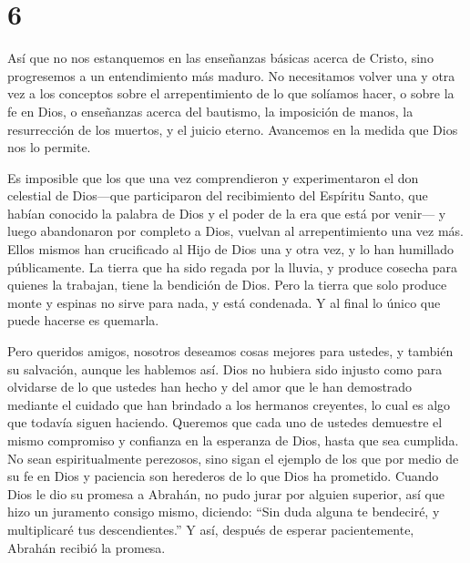 \hypertarget{section-5}{%
\section{6}\label{section-5}}

 Así que no nos estanquemos en las enseñanzas básicas acerca
de Cristo, sino progresemos a un entendimiento más maduro. No
necesitamos volver una y otra vez a los conceptos sobre el
arrepentimiento de lo que solíamos hacer, o sobre la fe en Dios,
 o enseñanzas acerca del bautismo, la imposición de manos,
la resurrección de los muertos, y el juicio eterno. 
Avancemos en la medida que Dios nos lo permite.

 Es imposible que los que una vez comprendieron y
experimentaron el don celestial de Dios---que participaron del
recibimiento del Espíritu Santo,  que habían conocido la
palabra de Dios y el poder de la era que está por venir--- 
y luego abandonaron por completo a Dios, vuelvan al arrepentimiento una
vez más. Ellos mismos han crucificado al Hijo de Dios una y otra vez, y
lo han humillado públicamente.  La tierra que ha sido regada
por la lluvia, y produce cosecha para quienes la trabajan, tiene la
bendición de Dios.  Pero la tierra que solo produce monte y
espinas no sirve para nada, y está condenada. Y al final lo único que
puede hacerse es quemarla.

 Pero queridos amigos, nosotros deseamos cosas mejores para
ustedes, y también su salvación, aunque les hablemos así. 
Dios no hubiera sido injusto como para olvidarse de lo que ustedes han
hecho y del amor que le han demostrado mediante el cuidado que han
brindado a los hermanos creyentes, lo cual es algo que todavía siguen
haciendo.  Queremos que cada uno de ustedes demuestre el
mismo compromiso y confianza en la esperanza de Dios, hasta que sea
cumplida.  No sean espiritualmente perezosos, sino sigan el
ejemplo de los que por medio de su fe en Dios y paciencia son herederos
de lo que Dios ha prometido.  Cuando Dios le dio su promesa
a Abrahán, no pudo jurar por alguien superior, así que hizo un juramento
consigo mismo,  diciendo: ``Sin duda alguna te bendeciré, y
multiplicaré tus descendientes.''  Y así, después de
esperar pacientemente, Abrahán recibió la promesa.

